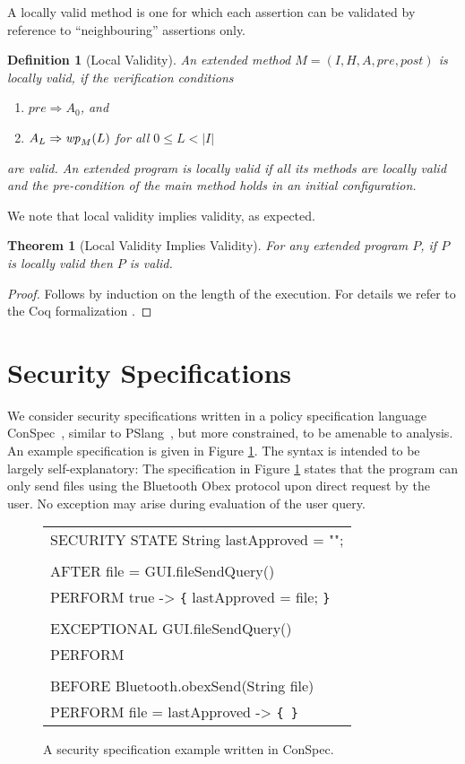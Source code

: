 \documentclass[10pt,twocolumn]{article}
\newtheorem{definition}{Definition}
\newtheorem{theorem}{Theorem}
\newcommand{\Pre}{\mathit{pre}}
\newcommand{\Post}{\mathit{post}}
\newcommand{\WP}{{\it wp}}
\begin{document}
A locally valid method is one for which each assertion can be validated
by reference to ``neighbouring'' assertions only.
\begin{definition}[Local Validity]\label{def:local_validity}
An extended method $M = (I, H, A, \Pre, \Post)$ is locally valid, if
the verification conditions
\begin{enumerate}
  \item $\Pre \Rightarrow A_0$, and
  \item $A_L \Rightarrow \WP_M(L)$ for all $0 \leq L < |I|$
\end{enumerate}
are valid. 
An extended program is locally valid if all its methods are locally valid 
and the pre-condition of the main method holds in an initial configuration.
\end{definition}
We note that local validity implies validity, as expected.
\begin{theorem}[Local Validity Implies Validity]\label{thm:loc_impl_glob}
For any extended program $P$, if $P$ is locally valid then $P$ is valid.
\end{theorem}
\begin{proof}
Follows by induction on the length of the execution. For details we refer to the Coq formalization \cite{coqscript}.
\end{proof}



\section{Security Specifications}\label{sect:policies}
We consider security specifications written in a policy specification 
language ConSpec~\cite{AktNal07}, similar to 
PSlang~\cite{ErlSchb00}, but more constrained, to be amenable to 
analysis. An example specification is given in Figure 
\ref{fig:conspec_example}. The syntax is intended to be largely 
self-explanatory: The specification in Figure \ref{fig:conspec_example} 
states that the program can only send files using the Bluetooth Obex 
protocol upon direct request by the user. No exception may arise 
during evaluation of the user query.
\begin{figure}
\centering
{\ttfamily
\begin{tabular}{@{}l@{}}
SECURITY STATE String lastApproved = "";\\
\\
AFTER file = GUI.fileSendQuery()\\
\phantom{~~~~}PERFORM true -> \verb+{+ lastApproved = file; \verb+}+\\
\\
EXCEPTIONAL GUI.fileSendQuery()\\
\phantom{~~~~}PERFORM\\
\\
BEFORE Bluetooth.obexSend(String file)\\
\phantom{~~~~}PERFORM file = lastApproved -> \verb+{ }+\\[2mm]
\end{tabular}
}
\caption{\label{fig:conspec_example} A security specification example written in ConSpec.}
\end{figure}
\end{document}
